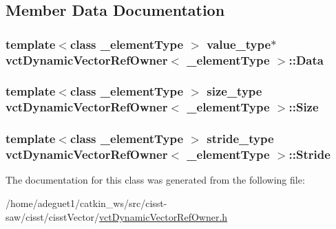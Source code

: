 \subsection{Member Data Documentation}
\hypertarget{classvct_dynamic_vector_ref_owner_a50664ce25ed6de8628998b3223998515}{
\subsubsection[{Data}]{\setlength{\rightskip}{0pt plus 5cm}template$<$class \-\_\-element\-Type $>$ value\-\_\-type$\ast$ {\bf vct\-Dynamic\-Vector\-Ref\-Owner}$<$ \-\_\-element\-Type $>$\-::Data\hspace{0.3cm}{\ttfamily [protected]}}}\label{classvct_dynamic_vector_ref_owner_a50664ce25ed6de8628998b3223998515}
\hypertarget{classvct_dynamic_vector_ref_owner_ab2a6a1ca285d5c64b4e39f6f33d1794d}{
\subsubsection[{Size}]{\setlength{\rightskip}{0pt plus 5cm}template$<$class \-\_\-element\-Type $>$ size\-\_\-type {\bf vct\-Dynamic\-Vector\-Ref\-Owner}$<$ \-\_\-element\-Type $>$\-::Size\hspace{0.3cm}{\ttfamily [protected]}}}\label{classvct_dynamic_vector_ref_owner_ab2a6a1ca285d5c64b4e39f6f33d1794d}
\hypertarget{classvct_dynamic_vector_ref_owner_ae346c9cef9e023214e0286791fedae25}{
\subsubsection[{Stride}]{\setlength{\rightskip}{0pt plus 5cm}template$<$class \-\_\-element\-Type $>$ stride\-\_\-type {\bf vct\-Dynamic\-Vector\-Ref\-Owner}$<$ \-\_\-element\-Type $>$\-::Stride\hspace{0.3cm}{\ttfamily [protected]}}}\label{classvct_dynamic_vector_ref_owner_ae346c9cef9e023214e0286791fedae25}


The documentation for this class was generated from the following file\-:\begin{DoxyCompactItemize}
\item 
/home/adeguet1/catkin\-\_\-ws/src/cisst-\/saw/cisst/cisst\-Vector/\hyperlink{vct_dynamic_vector_ref_owner_8h}{vct\-Dynamic\-Vector\-Ref\-Owner.\-h}\end{DoxyCompactItemize}
